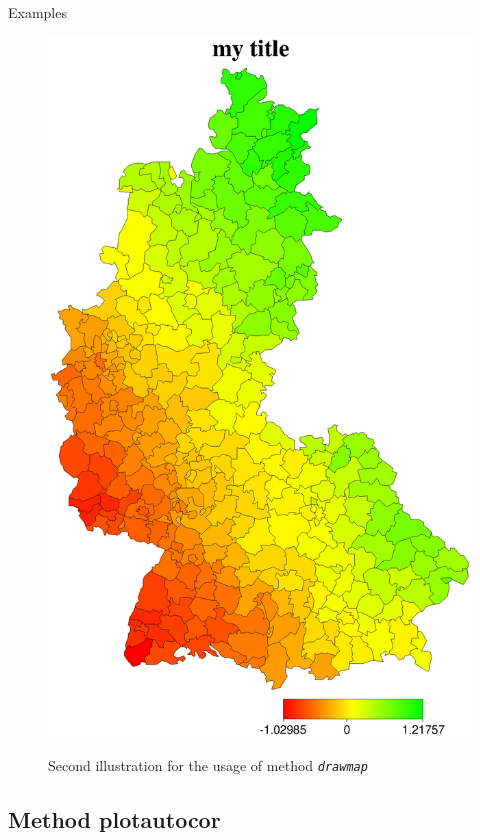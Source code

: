 \begin{stanza}{Examples}
\begin{figure}[ht]
\begin{center}
\includegraphics[scale=0.4]{grafiken/drawmapexample2.ps}
{\em\caption{ \label{drawmapexample2} Second illustration for the
usage of method \em \texttt{drawmap}}}
\end{center}
\end{figure}

\end{stanza}

\clearpage

\subsection{Method plotautocor} \label{plotautocor}

